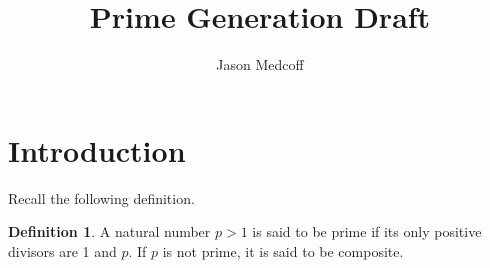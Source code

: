 \documentclass{amsart}
\title{Prime Generation Draft}
\author{Jason Medcoff}
\date{}
\theoremstyle{definition}
\newtheorem{definition}{Definition}[section]
\theoremstyle{case}
\begin{document}
    \maketitle
    
    
    
    
    
    \section{Introduction}
    

	Recall the following definition.
	\begin{definition}
		A natural number $p>1$ is said to be prime if its only positive divisors are 1 and $p$. If $p$ is not prime, it is said to be composite.
	\end{definition}
	
\end{document}
